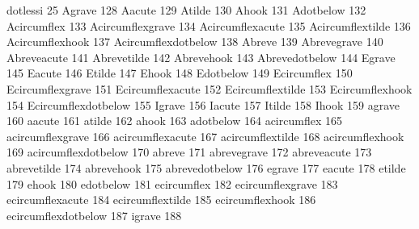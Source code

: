 dotlessi             25
 Agrave              128
 Aacute              129
 Atilde              130
 Ahook               131
 Adotbelow           132
 Acircumflex         133
 Acircumflexgrave    134
 Acircumflexacute    135
 Acircumflextilde    136
 Acircumflexhook     137
 Acircumflexdotbelow 138
 Abreve              139
 Abrevegrave         140
 Abreveacute         141
 Abrevetilde         142
 Abrevehook          143
 Abrevedotbelow      144
 Egrave              145
 Eacute              146
 Etilde              147
 Ehook               148
 Edotbelow           149
 Ecircumflex         150
 Ecircumflexgrave    151
 Ecircumflexacute    152
 Ecircumflextilde    153
 Ecircumflexhook     154
 Ecircumflexdotbelow 155
 Igrave              156
 Iacute              157
 Itilde              158
 Ihook               159
 agrave              160
 aacute              161
 atilde              162
 ahook               163
 adotbelow           164
 acircumflex         165
 acircumflexgrave    166
 acircumflexacute    167
 acircumflextilde    168
 acircumflexhook     169
 acircumflexdotbelow 170
 abreve              171
 abrevegrave         172
 abreveacute         173
 abrevetilde         174
 abrevehook          175
 abrevedotbelow      176
 egrave              177
 eacute              178
 etilde              179
 ehook               180
 edotbelow           181
 ecircumflex         182
 ecircumflexgrave    183
 ecircumflexacute    184
 ecircumflextilde    185
 ecircumflexhook     186
 ecircumflexdotbelow 187
 igrave              188

